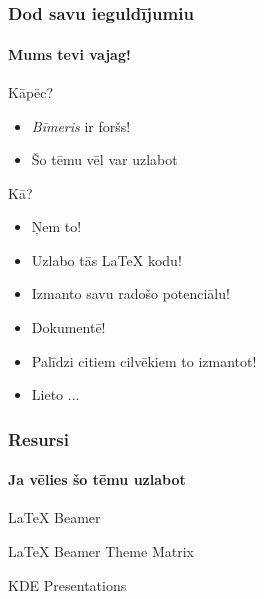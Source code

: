 \documentclass[12pt]{beamer}
\begin{document}
\section*{}
\begin{frame}
  \frametitle{Dod savu ieguldījumiu}
  \framesubtitle{Mums tevi vajag!}

  \begin{block}{Kāpēc?}
  \begin{itemize}
    \item \textit{Bīmeris} ir foršs!
    \item Šo tēmu vēl var uzlabot
  \end{itemize}
  \end{block}

  \begin{block}{Kā?}
  \begin{itemize}
    \item Ņem to!
    \item Uzlabo tās LaTeX kodu!
    \item Izmanto savu radošo potenciālu!
    \item Dokumentē!
    \item Palīdzi citiem cilvēkiem to izmantot!
    \item Lieto ...
  \end{itemize}
  \end{block}
\end{frame}

\begin{frame}
  \frametitle{Resursi}
  \framesubtitle{Ja vēlies šo tēmu uzlabot}
  \begin{thebibliography}{10}

  \beamertemplatearticlebibitems

    LaTeX Beamer

    LaTeX Beamer Theme Matrix

    KDE Presentations

  \end{thebibliography}
\end{frame}

\end{document}
